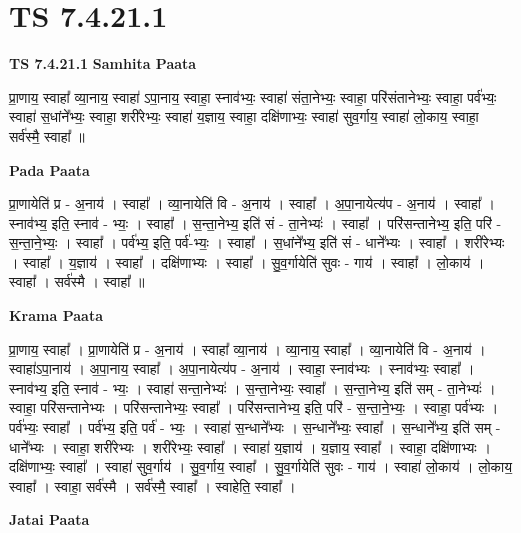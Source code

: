 \documentclass[17pt]{extarticle}
\begin{document}
\section{ TS 7.4.21.1 }

\textbf{TS 7.4.21.1 } \newline
\textbf{Samhita Paata} \newline

प्रा॒णाय॒ स्वाहा᳚ व्या॒नाय॒ स्वाहा॑ ऽपा॒नाय॒ स्वाहा॒ स्नाव॑भ्यः॒ स्वाहा॑ संता॒नेभ्यः॒ स्वाहा॒ परि॑संतानेभ्यः॒ स्वाहा॒ पर्व॑भ्यः॒ स्वाहा॑ स॒धांने᳚भ्यः॒ स्वाहा॒ शरी॑रेभ्यः॒ स्वाहा॑ य॒ज्ञाय॒ स्वाहा॒ दक्षि॑णाभ्यः॒ स्वाहा॑ सुव॒र्गाय॒ स्वाहा॑ लो॒काय॒ स्वाहा॒ सर्व॑स्मै॒ स्वाहा᳚ ॥ \newline

\textbf{Pada Paata} \newline

प्रा॒णायेति॑ प्र - अ॒नाय॑ । स्वाहा᳚ । व्या॒नायेति॑ वि - अ॒नाय॑ । स्वाहा᳚ । अ॒पा॒नायेत्य॑प - अ॒नाय॑ । स्वाहा᳚ । स्नाव॑भ्य॒ इति॒ स्नाव॑ - भ्यः॒ । स्वाहा᳚ । स॒न्ता॒नेभ्य॒ इति॑ सं - ता॒नेभ्यः॑ । स्वाहा᳚ । परि॑सन्तानेभ्य॒ इति॒ परि॑ - स॒न्ता॒ने॒भ्यः॒ । स्वाहा᳚ । पर्व॑भ्य॒ इति॒ पर्व॑-भ्यः॒ । स्वाहा᳚ । स॒धांने᳚भ्य॒ इति॑ सं - धाने᳚भ्यः । स्वाहा᳚ । शरी॑रेभ्यः । स्वाहा᳚ । य॒ज्ञाय॑ । स्वाहा᳚ । दक्षि॑णाभ्यः । स्वाहा᳚ । सु॒व॒र्गायेति॑ सुवः - गाय॑ । स्वाहा᳚ । लो॒काय॑ । स्वाहा᳚ । सर्व॑स्मै । स्वाहा᳚ ॥  \newline


\textbf{Krama Paata} \newline

प्रा॒णाय॒ स्वाहा᳚ । प्रा॒णायेति॑ प्र - अ॒नाय॑ । स्वाहा᳚ व्या॒नाय॑ । व्या॒नाय॒ स्वाहा᳚ । व्या॒नायेति॑ वि - अ॒नाय॑ । स्वाहा॑ऽपा॒नाय॑ । अ॒पा॒नाय॒ स्वाहा᳚ । अ॒पा॒नायेत्य॑प - अ॒नाय॑ । स्वाहा॒ स्नाव॑भ्यः । स्नाव॑भ्यः॒ स्वाहा᳚ । स्नाव॑भ्य॒ इति॒ स्नाव॑ - भ्यः॒ । स्वाहा॑ सन्ता॒नेभ्यः॑ । स॒न्ता॒नेभ्यः॒ स्वाहा᳚ । स॒न्ता॒नेभ्य॒ इति॑ सम् - ता॒नेभ्यः॑ । स्वाहा॒ परि॑सन्तानेभ्यः । परि॑सन्तानेभ्यः॒ स्वाहा᳚ । परि॑सन्तानेभ्य॒ इति॒ परि॑ - स॒न्ता॒ने॒भ्यः॒ । स्वाहा॒ पर्व॑भ्यः । पर्व॑भ्यः॒ स्वाहा᳚ । पर्व॑भ्य॒ इति॒ पर्व॑ - भ्यः॒ । स्वाहा॑ स॒न्धाने᳚भ्यः । स॒न्धाने᳚भ्यः॒ स्वाहा᳚ । स॒न्धाने᳚भ्य॒ इति॑ सम् - धाने᳚भ्यः । स्वाहा॒ शरी॑रेभ्यः । शरी॑रेभ्यः॒ स्वाहा᳚ । स्वाहा॑ य॒ज्ञाय॑ । य॒ज्ञाय॒ स्वाहा᳚ । स्वाहा॒ दक्षि॑णाभ्यः । दक्षि॑णाभ्यः॒ स्वाहा᳚ । स्वाहा॑ सुव॒र्गाय॑ । सु॒व॒र्गाय॒ स्वाहा᳚ । सु॒व॒र्गायेति॑ सुवः - गाय॑ । स्वाहा॑ लो॒काय॑ । लो॒काय॒ स्वाहा᳚ । स्वाहा॒ सर्व॑स्मै । सर्व॑स्मै॒ स्वाहा᳚ । स्वाहेति॒ स्वाहा᳚ । \newline

\textbf{Jatai Paata} \newline
\end{document}
